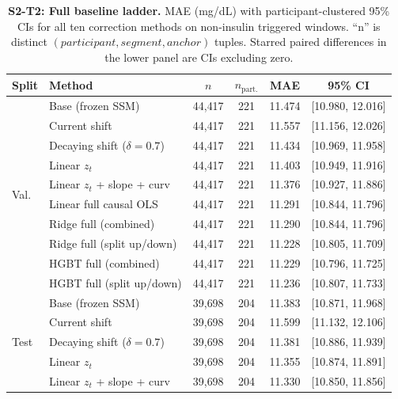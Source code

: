 \begin{table}[H]
  \centering
  \caption{%
    \textbf{S2-T2: Full baseline ladder.}
    MAE (mg/dL) with participant-clustered 95\% CIs for all ten correction
    methods on non-insulin triggered windows.
    ``n'' is distinct $(participant, segment, anchor)$ tuples.
    Starred paired differences in the lower panel are CIs excluding zero.%
  }
  \label{tab:study2_ladder_rich}
  \small
  \setlength{\tabcolsep}{4.5pt}
  \begin{tabular}{llcccc}
    \toprule
    Split & Method & $n$ & $n_{\text{part.}}$ & MAE & 95\% CI \\
    \midrule
    \multirow{10}{*}{Val.}
      & Base (frozen SSM)              & 44{,}417 & 221 & 11.474 & [10.980, 12.016] \\
      & Current shift                  & 44{,}417 & 221 & 11.557 & [11.156, 12.026] \\
      & Decaying shift ($\delta=0.7$)  & 44{,}417 & 221 & 11.434 & [10.969, 11.958] \\
      & Linear $z_t$                   & 44{,}417 & 221 & 11.403 & [10.949, 11.916] \\
      & Linear $z_t$ + slope + curv    & 44{,}417 & 221 & 11.376 & [10.927, 11.886] \\
      & Linear full causal OLS         & 44{,}417 & 221 & 11.291 & [10.844, 11.796] \\
      & Ridge full (combined)          & 44{,}417 & 221 & 11.290 & [10.844, 11.796] \\
      & Ridge full (split up/down)     & 44{,}417 & 221 & 11.228 & [10.805, 11.709] \\
      & HGBT full (combined)           & 44{,}417 & 221 & 11.229 & [10.796, 11.725] \\
      & HGBT full (split up/down)      & 44{,}417 & 221 & 11.236 & [10.807, 11.733] \\
    \midrule
    \multirow{10}{*}{Test}
      & Base (frozen SSM)              & 39{,}698 & 204 & 11.383 & [10.871, 11.968] \\
      & Current shift                  & 39{,}698 & 204 & 11.599 & [11.132, 12.106] \\
      & Decaying shift ($\delta=0.7$)  & 39{,}698 & 204 & 11.381 & [10.886, 11.939] \\
      & Linear $z_t$                   & 39{,}698 & 204 & 11.355 & [10.874, 11.891] \\
      & Linear $z_t$ + slope + curv    & 39{,}698 & 204 & 11.330 & [10.850, 11.856] \\

\end{tabular}
\end{table}
